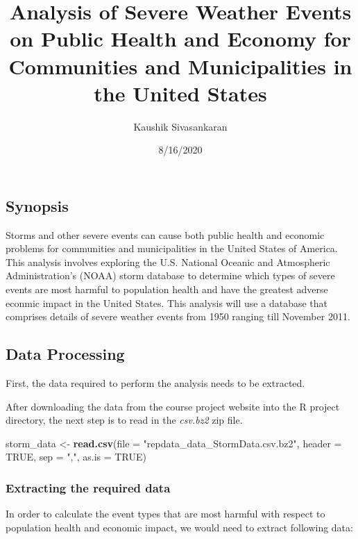 \documentclass[
]{article}
\title{Analysis of Severe Weather Events on Public Health and Economy for
Communities and Municipalities in the United States}
\author{Kaushik Sivasankaran}
\date{8/16/2020}
\newenvironment{Shaded}{\begin{snugshade}}{\end{snugshade}}
\newcommand{\DataTypeTok}[1]{\textcolor[rgb]{0.13,0.29,0.53}{#1}}
\newcommand{\KeywordTok}[1]{\textcolor[rgb]{0.13,0.29,0.53}{\textbf{#1}}}
\newcommand{\NormalTok}[1]{#1}
\newcommand{\OtherTok}[1]{\textcolor[rgb]{0.56,0.35,0.01}{#1}}
\newcommand{\StringTok}[1]{\textcolor[rgb]{0.31,0.60,0.02}{#1}}
\begin{document}
\maketitle

\hypertarget{synopsis}{%
\subsection{Synopsis}\label{synopsis}}

Storms and other severe events can cause both public health and economic
problems for communities and municipalities in the United States of
America. This analysis involves exploring the U.S. National Oceanic and
Atmospheric Administration's (NOAA) storm database to determine which
types of severe events are most harmful to population health and have
the greatest adverse econmic impact in the United States. This analysis
will use a database that comprises details of severe weather events from
1950 ranging till November 2011.

\hypertarget{data-processing}{%
\subsection{Data Processing}\label{data-processing}}

First, the data required to perform the analysis needs to be extracted.

After downloading the data from the course project website into the R
project directory, the next step is to read in the \emph{csv.bz2} zip
file.

\begin{Shaded}
\begin{Highlighting}[]
\NormalTok{storm_data <-}\StringTok{ }\KeywordTok{read.csv}\NormalTok{(}\DataTypeTok{file =} \StringTok{"repdata_data_StormData.csv.bz2"}\NormalTok{, }\DataTypeTok{header =} \OtherTok{TRUE}\NormalTok{, }\DataTypeTok{sep =} \StringTok{","}\NormalTok{, }\DataTypeTok{as.is =} \OtherTok{TRUE}\NormalTok{)}
\end{Highlighting}
\end{Shaded}

\hypertarget{extracting-the-required-data}{%
\subsubsection{Extracting the required
data}\label{extracting-the-required-data}}

In order to calculate the event types that are most harmful with respect
to population health and economic impact, we would need to extract
following data:
\end{document}

